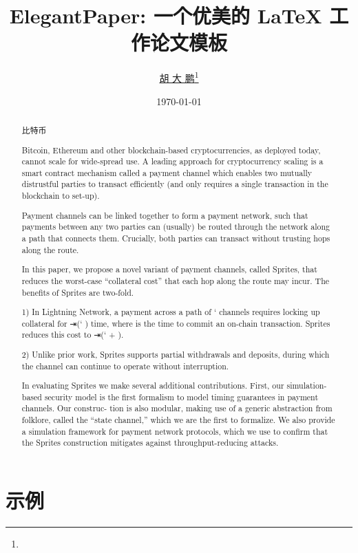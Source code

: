 \documentclass[lang=cn]{elegantpaper}
\title{ElegantPaper: 一个优美的 \LaTeX{} 工作论文模板}
\author{\href{https://github.com/dapenghu}{胡 大 鹏}\thanks{}}
\institute{OK区块链工程院}
\date{\today}
\begin{document}
\maketitle

\begin{abstract}

\noindent 比特币

Bitcoin, Ethereum and other blockchain-based cryptocurrencies, as deployed today, cannot scale for wide-spread use. A leading approach for cryptocurrency scaling is a smart contract mechanism called a payment channel which enables two mutually distrustful parties to transact efficiently (and only requires a single transaction in the blockchain to set-up). 

Payment channels can be linked together to form a payment network, such that payments between any two parties can (usually) be routed through the network along a path that connects them. Crucially, both parties can transact without trusting hops along the route.

In this paper, we propose a novel variant of payment channels, called Sprites, that reduces the worst-case “collateral cost” that each hop along the route may incur. The benefits of Sprites are two-fold. 

1) In Lightning Network, a payment across a path of ` channels requires locking up collateral for ⇥(` ) time, where   is the time to commit an on-chain transaction. Sprites reduces this cost to ⇥(` +  ). 

2) Unlike prior work, Sprites supports partial withdrawals and deposits, during which the channel can continue to operate without interruption.

In evaluating Sprites we make several additional contributions. First, our simulation-based security model is the first formalism to model timing guarantees in payment channels. Our construc- tion is also modular, making use of a generic abstraction from folklore, called the “state channel,” which we are the first to formalize. We also provide a simulation framework for payment network protocols, which we use to confirm that the Sprites construction mitigates against throughput-reducing attacks.

\end{abstract}

\section{示例}


\end{document}
